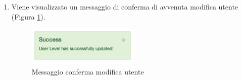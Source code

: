 \begin{enumerate}
				\item Viene visualizzato un messaggio di conferma di avvenuta modifica utente (Figura \ref{fig:confirmEditUser}).

					\begin{figure}[H]
						\centering \includegraphics[width=0.5\textwidth]{img/confirmEditUser.png}
						\caption{ \label{fig:confirmEditUser} Messaggio conferma modifica utente}
					\end{figure}

			\end{enumerate}  
	
	\clearpage
